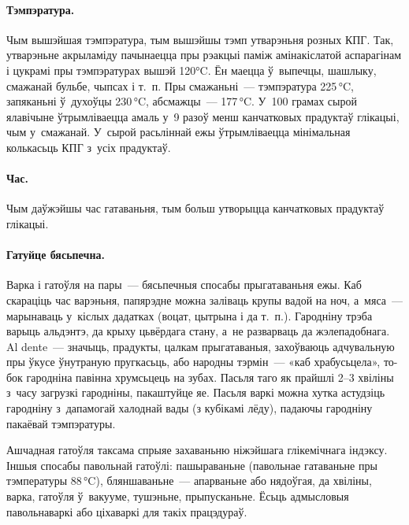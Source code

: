 \paragraph{Тэмпэратура.}
Чым вышэйшая тэмпэратура, тым вышэйшы тэмп утварэньня розных КПГ. Так, утварэньне акрыламіду пачынаецца пры рэакцыі паміж амінакіслатой аспарагінам і цукрамі пры тэмпэратурах вышэй 120°C. Ён маецца ў~выпечцы, шашлыку, смажанай бульбе, чыпсах і т.~п. Пры смажаньні~--- тэмпэратура 225\,°C, запяканьні ў~духоўцы 230\,°C, абсмажцы~--- 177\,°C. У~100 грамах сырой ялавічыне ўтрымліваецца амаль у~9 разоў менш канчатковых прадуктаў глікацыі, чым у~смажанай. У~сырой расьліннай ежы ўтрымліваецца мінімальная колькасьць КПГ з~усіх прадуктаў.

\paragraph{Час.}
Чым даўжэйшы час гатаваньня, тым больш утворыцца канчатковых прадуктаў глікацыі.


\paragraph{Гатуйце бясьпечна.}
Варка і гатоўля на пары~--- бясьпечныя спосабы прыгатаваньня ежы. Каб скараціць час варэньня, папярэдне можна заліваць крупы вадой на ноч, а~мяса~--- марынаваць у~кіслых дадатках (воцат, цытрына і да т.~п.). Гародніну трэба варыць альдэнтэ, да крыху цьвёрдага стану, а~не разварваць да жэлепадобнага. Al dente~--- значыць, прадукты, цалкам прыгатаваныя, захоўваюць адчувальную пры ўкусе ўнутраную пругкасьць, або народны тэрмін~--- «каб храбусьцела», то-бок гародніна павінна хрумсьцець на зубах. Пасьля таго як прайшлі 2--3 хвіліны з~часу загрузкі гародніны, пакаштуйце яе. Пасьля варкі можна хутка астудзіць гародніну з~дапамогай халоднай вады (з кубікамі лёду), падаючы гародніну пакаёвай тэмпэратуры.

Ашчадная гатоўля таксама спрыяе захаваньню ніжэйшага глікемічнага індэксу. Іншыя спосабы павольнай гатоўлі: пашыраваньне (павольнае гатаваньне пры тэмпературы 88\,°C), бляншаваньне~--- апарваньне або нядоўгая, да хвіліны, варка, гатоўля ў~вакууме, тушэньне, прыпусканьне. Ёсьць адмысловыя павольнаваркі або ціхаваркі для такіх працэдураў.

